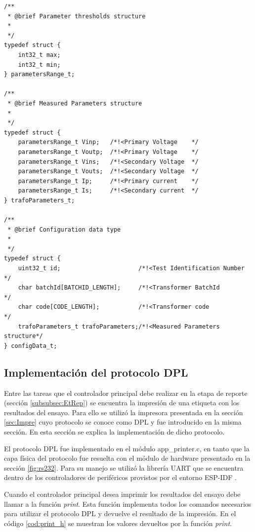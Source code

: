 \begin{lstlisting}[label=cod:struct_http,caption=Estructuras para el manejo de los datos recibidos.]
/**
 * @brief Parameter thresholds structure
 *
 */
typedef struct {
	int32_t max;
	int32_t min;
} parametersRange_t;

/**
 * @brief Measured Parameters structure
 *
 */
typedef struct {
	parametersRange_t Vinp;   /*!<Primary Voltage    */
	parametersRange_t Voutp;  /*!<Primary Voltage    */
	parametersRange_t Vins;   /*!<Secondary Voltage  */
	parametersRange_t Vouts;  /*!<Secondary Voltage  */
	parametersRange_t Ip;     /*!<Primary current    */
	parametersRange_t Is;     /*!<Secondary current  */
} trafoParameters_t;

/**
 * @brief Configuration data type
 *
 */
typedef struct {
	uint32_t id;                      /*!<Test Identification Number   */
	char batchId[BATCHID_LENGTH];     /*!<Transformer BatchId          */
	char code[CODE_LENGTH];           /*!<Transformer code             */
	trafoParameters_t trafoParameters;/*!<Measured Parameters structure*/
} configData_t;
\end{lstlisting}


\subsection{Implementación del protocolo DPL}

Entre las tareas que el controlador principal debe realizar en la etapa de reporte (sección \ref{subsubsec:EtRep}) se encuentra la impresión de una etiqueta con los resultados del ensayo. Para ello se utilizó la impresora presentada en la sección \ref{sec:Impre} cuyo protocolo se conoce como DPL y fue introducido en la misma sección. En esta sección se explica la implementación de dicho protocolo.

El protocolo DPL fue implementado en el módulo app\_printer.c, en tanto que la capa física del protocolo fue resuelta con el módulo de hardware presentado en la sección \ref{fig:rs232}. Para su manejo se utilizó la librería UART que se encuentra dentro de los controladores de periféricos provistos por el entorno ESP-IDF \citep{ESPIDF:PER}.

Cuando el controlador principal desea imprimir los resultados del ensayo debe llamar a la función \textit{print}. Esta función implementa todos los comandos necesarios para utilizar el protocolo DPL y devuelve el resultado de la impresión. En el código \ref{cod:print_h} se muestran los valores devueltos por la función \textit{print}.

